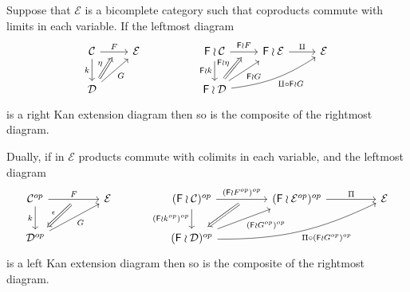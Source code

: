 \documentclass[a4paper,10pt]{article}%
\begin{document}
\begin{lemma}\label{FINWREATPRODLIM LEM}
Suppose that $\mathcal{E}$ is a bicomplete category such that 
coproducts commute with limits in each variable. If the leftmost diagram
\begin{equation}\label{WRRAN EQ}
	\begin{tikzcd}
	\mathcal{C} \ar{r}[swap,name=F]{}{F} \ar{d}[swap]{k} &
	\mathcal{E} & 
	& 
	\Fin \wr \mathcal{C} \ar{r}[swap,name=FF]{}{\Fin \wr F} \ar{d}[swap]{\Fin \wr k}&
	\Fin \wr \mathcal{E} \ar{r}{\amalg} &
	\mathcal{E}
		\\
	|[alias=D]|\mathcal{D} \ar{ru}[swap]{G} &
	& & 
	|[alias=FD]|\Fin \wr \mathcal{D} \ar{ru}[swap]{\Fin \wr G}
	\ar[bend right=13]{rru}[swap]{\amalg \circ \Fin \wr G}
	\arrow[Rightarrow, from=D, to=F,shorten <=0.10cm,"\eta"]
	\arrow[Rightarrow, from=FD, to=FF,shorten <=0.10cm,"\Fin \wr \eta"]
	\end{tikzcd}
\end{equation}
is a right Kan extension diagram then so is the composite of the rightmost diagram. 

Dually, if in $\mathcal{E}$ products commute with colimits in each variable, and the leftmost diagram
\begin{equation}\label{WRLAN EQ}
	\begin{tikzcd}[column sep = 4.5em]
	\mathcal{C}^{op} \ar{r}[swap,name=F]{}{F} \ar{d}[swap]{k} & 
	\mathcal{E} & 
	(\Fin \wr \mathcal{C})^{op} \ar{d}[swap]{(\Fin \wr k^{op})^{op}} 
	\ar{r}[swap,name=FF]{}{(\Fin \wr F^{op})^{op}} & 
	(\Fin \wr \mathcal{E}^{op})^{op} \ar{r}{\Pi} &
	\mathcal{E}
	\\
	|[alias=D]|\mathcal{D}^{op} \ar{ru}[swap]{G} &
	& 
	|[alias=FD]|(\Fin \wr \mathcal{D})^{op} 
	\ar{ru}[swap]{(\Fin \wr G^{op})^{op}}
	\ar[bend right=13]{rru}[swap]{\Pi \circ (\Fin \wr G^{op})^{op}}
	&
	\arrow[Leftarrow, from=D, to=F,shorten <=0.10cm,"\epsilon"]
	\arrow[Leftarrow, from=FD, to=FF,shorten <=0.10cm]
	\end{tikzcd}
\end{equation}
is a left Kan extension diagram then so is the composite of the rightmost diagram. 
\end{lemma}
\end{document}
